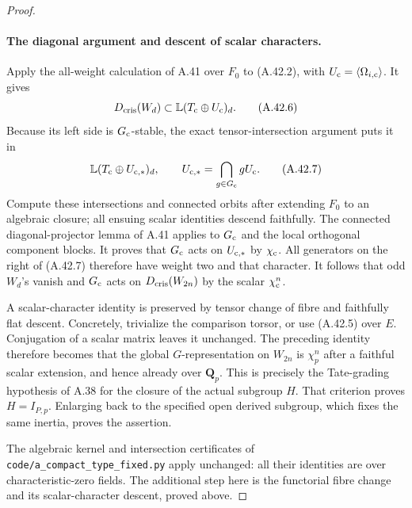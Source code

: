 \begin{proof}
\paragraph{The diagonal argument and descent of scalar characters.}
Apply the all-weight calculation of A.41 over \(F_0\)
to (A.42.2), with
\(U_{\rm c}=\langle\Omega_{i,\rm c}\rangle\).
It gives
\[
 D_{\rm cris}(W_d)\subset
                  \mathbb L(T_{\rm c}\oplus U_{\rm c})_d.
                                                               \tag{A.42.6}
\]
Because its left side is \(G_{\rm c}\)-stable, the
exact tensor-intersection argument puts it in
\[
 \mathbb L(T_{\rm c}\oplus U_{\rm c,*})_d,
           \qquad U_{\rm c,*}=\bigcap_{g\in G_{\rm c}}gU_{\rm c}.
                                                               \tag{A.42.7}
\]
Compute these intersections and connected orbits after extending
\(F_0\) to an algebraic closure; all ensuing scalar identities
descend faithfully. The connected diagonal-projector lemma of A.41 applies
to \(G_{\rm c}\) and the local orthogonal component
blocks. It proves that \(G_{\rm c}\) acts on
\(U_{\rm c,*}\) by \(\chi_{\rm c}\). All generators
on the right of (A.42.7) therefore have weight two and
that character. It follows that odd \(W_d\)'s vanish
and \(G_{\rm c}\) acts on \(D_{\rm cris}(W_{2n})\)
by the scalar \(\chi_{\rm c}^n\).

A scalar-character identity is preserved by tensor
change of fibre and faithfully flat descent. Concretely,
trivialize the comparison torsor, or use (A.42.5) over
\(E\). Conjugation of a scalar matrix leaves it
unchanged. The preceding identity therefore becomes
that the global \(G\)-representation on
\(W_{2n}\) is \(\chi_p^n\) after a faithful scalar
extension, and hence already over \(\mathbf Q_p\).
This is precisely the Tate-grading hypothesis of A.38
for the closure of the actual subgroup \(H\). That
criterion proves \(H=I_{P,p}\). Enlarging back to the
specified open derived subgroup, which fixes the same
inertia, proves the assertion.

The algebraic kernel and intersection certificates of
\texttt{code/a\_compact\_type\_fixed.py} apply unchanged:
all their identities are over characteristic-zero fields.
The additional step here is the functorial fibre change
and its scalar-character descent, proved above.
\end{proof}
